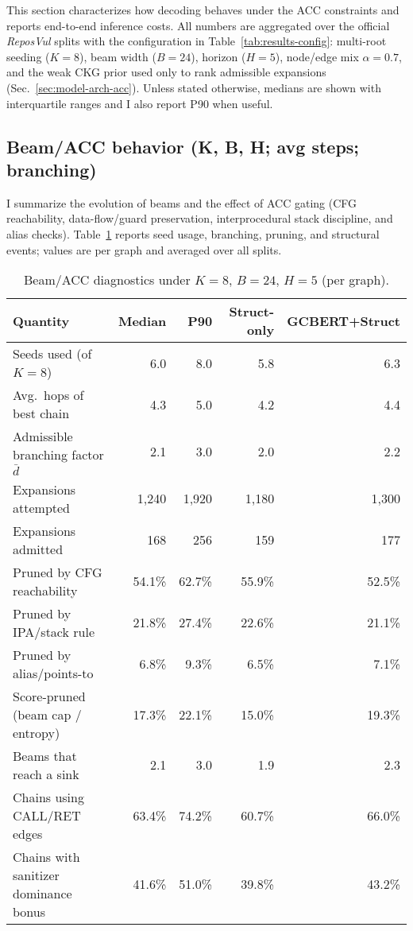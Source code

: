 \documentclass{buthesis}
\begin{document}
This section characterizes how decoding behaves under the ACC constraints and reports end-to-end inference costs. All numbers are aggregated over the official \emph{ReposVul} splits with the configuration in Table~\ref{tab:results-config}: multi-root seeding ($K{=}8$), beam width ($B{=}24$), horizon ($H{=}5$), node/edge mix $\alpha{=}0.7$, and the weak CKG prior used only to rank admissible expansions (Sec.~\ref{sec:model-arch-acc}). Unless stated otherwise, medians are shown with interquartile ranges and I also report P90 when useful.

\subsection{Beam/ACC behavior (K, B, H; avg steps; branching)}
\label{subsec:decoding-beam}

I summarize the evolution of beams and the effect of ACC gating (CFG reachability, data-flow/guard preservation, interprocedural stack discipline, and alias checks). Table~\ref{tab:beam-diagnostics} reports seed usage, branching, pruning, and structural events; values are per graph and averaged over all splits.

\begin{table}[H]
\centering
\small
\setlength{\tabcolsep}{6pt}
\renewcommand{\arraystretch}{1.12}
\caption{Beam/ACC diagnostics under $K{=}8$, $B{=}24$, $H{=}5$ (per graph).}
\label{tab:beam-diagnostics}
\begin{tabular}{lrrrr}
\toprule
\textbf{Quantity} & \textbf{Median} & \textbf{P90} & \textbf{Struct-only} & \textbf{GCBERT+Struct} \\
\midrule
Seeds used (of $K{=}8$) & 6.0 & 8.0 & 5.8 & 6.3 \\
Avg.\ hops of best chain & 4.3 & 5.0 & 4.2 & 4.4 \\
Admissible branching factor $\bar d$ & 2.1 & 3.0 & 2.0 & 2.2 \\
Expansions attempted & 1{,}240 & 1{,}920 & 1{,}180 & 1{,}300 \\
Expansions admitted & 168 & 256 & 159 & 177 \\
Pruned by CFG reachability & 54.1\% & 62.7\% & 55.9\% & 52.5\% \\
Pruned by IPA/stack rule & 21.8\% & 27.4\% & 22.6\% & 21.1\% \\
Pruned by alias/points-to & 6.8\% & 9.3\% & 6.5\% & 7.1\% \\
Score-pruned (beam cap / entropy) & 17.3\% & 22.1\% & 15.0\% & 19.3\% \\
Beams that reach a sink & 2.1 & 3.0 & 1.9 & 2.3 \\
Chains using CALL/RET edges & 63.4\% & 74.2\% & 60.7\% & 66.0\% \\
Chains with sanitizer dominance bonus & 41.6\% & 51.0\% & 39.8\% & 43.2\% \\
\bottomrule
\end{tabular}
\end{table}
\end{document}

